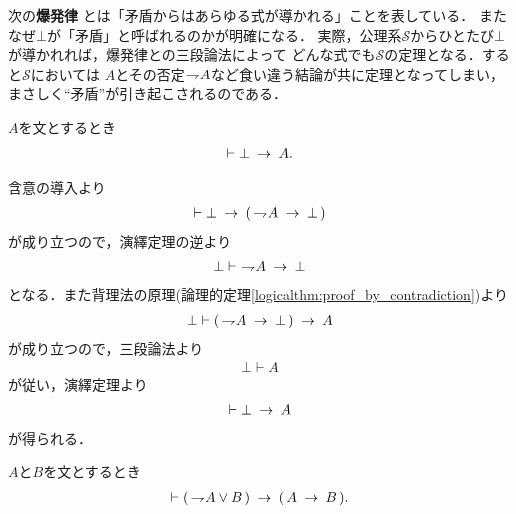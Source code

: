 	次の{\bf 爆発律}
	とは「矛盾からはあらゆる式が導かれる」ことを表している．
	またなぜ$\bot$が「矛盾」と呼ばれるのかが明確になる．
	実際，公理系$\mathscr{S}$からひとたび$\bot$が導かれれば，爆発律との三段論法によって
	どんな式でも$\mathscr{S}$の定理となる．すると$\mathscr{S}$においては
	$A$とその否定$\rightharpoondown\hspace{-0.25em} A$など食い違う結論が共に定理となってしまい，
	まさしく``矛盾''が引き起こされるのである．
	
	\begin{screen}
		\begin{logicalthm}[爆発律]
		\label{logicalthm:principle_of_explosion}
			$A$を文とするとき
			\begin{align}
				\vdash \bot \hspace{0.25em}\rightarrow\hspace{0.25em} A.
			\end{align}
		\end{logicalthm}
	\end{screen}
	
	\begin{prf}
		含意の導入より
		\begin{align}
			\vdash \bot \hspace{0.25em}\rightarrow\hspace{0.25em} (\, \rightharpoondown\hspace{-0.25em} A \hspace{0.25em}\rightarrow\hspace{0.25em} \bot\, )
		\end{align}
		が成り立つので，演繹定理の逆より
		\begin{align}
			\bot \vdash\ \rightharpoondown\hspace{-0.25em} A \hspace{0.25em}\rightarrow\hspace{0.25em} \bot
		\end{align}
		となる．また背理法の原理(論理的定理\ref{logicalthm:proof_by_contradiction})より
		\begin{align}
			\bot \vdash (\, \rightharpoondown\hspace{-0.25em} A \hspace{0.25em}\rightarrow\hspace{0.25em} \bot\, ) \hspace{0.25em}\rightarrow\hspace{0.25em} A
		\end{align}
		が成り立つので，三段論法より
		\begin{align}
			\bot \vdash A
		\end{align}
		が従い，演繹定理より
		\begin{align}
			\vdash \bot \hspace{0.25em}\rightarrow\hspace{0.25em} A
		\end{align}
		が得られる．
		\QED
	\end{prf}
	
	\begin{screen}
		\begin{logicalthm}[否定の論理和は含意で書ける]
		\label{logicalthm:disjunction_of_negation_rewritable_by_implication}
			$A$と$B$を文とするとき
			\begin{align}
				\vdash (\, \rightharpoondown\hspace{-0.25em} A \vee B\, ) \hspace{0.25em}\rightarrow\hspace{0.25em} (\, A \hspace{0.25em}\rightarrow\hspace{0.25em} B\, ).
			\end{align}
		\end{logicalthm}
	\end{screen}
	
